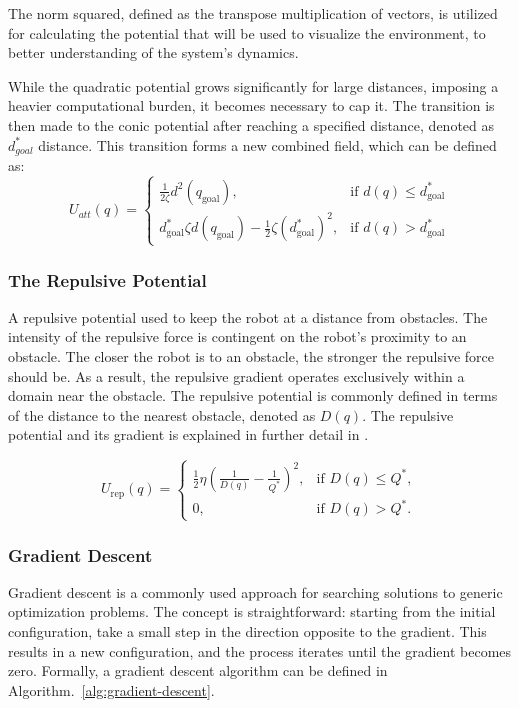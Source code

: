 \documentclass{IEEEtaes}
\begin{document}
{The norm squared, defined as the transpose multiplication of vectors, is utilized for calculating the potential that will be used to visualize the environment, to better understanding of the system's dynamics.

While the quadratic potential grows significantly for large distances, imposing a heavier computational burden, it becomes necessary to cap it. The transition is then made to the conic potential after reaching a specified distance, denoted as $d^*_{goal}$ distance. This transition forms a new combined field, which can be defined as:
\begin{equation*}
U_{att}(q)=
\begin{cases}
        \frac{1}{2\zeta} d^2(q_{\text{goal}}),  &\text{if } d(q) \leq d^*_{\text{goal}} \\
        d^*_{\text{goal}} \zeta d(q_{\text{goal}}) - \frac{1}{2}\zeta \left(d^*_{\text{goal}}\right)^2,  &\text{if } d(q) > d^*_{\text{goal}}
\end{cases}
\end{equation*}


\subsubsection{The Repulsive Potential}

A repulsive potential used to keep the robot at a distance from obstacles. The intensity of the repulsive force is contingent on the robot's proximity to an obstacle. The closer the robot is to an obstacle, the stronger the repulsive force should be. As a result, the repulsive gradient operates exclusively within a domain near the obstacle. The repulsive potential is commonly defined in terms of the distance to the nearest obstacle, denoted as $D(q)$. The repulsive potential and its gradient is explained in further detail in \cite{choset}.

\begin{equation*}
    U_{\text{rep}}(q) =
    \begin{cases}
        \frac{1}{2}\eta (\frac{1}{D(q)} - \frac{1}{Q^*})^2, & \text{if } D(q) \leq Q^*, \\
        0, & \text{if } D(q) > Q^*.
    \end{cases}
\end{equation*}


\subsubsection{Gradient Descent}
Gradient descent is a commonly used approach for searching solutions to generic optimization problems. The concept is straightforward: starting from the initial configuration, take a small step in the direction opposite to the gradient. This results in a new configuration, and the process iterates until the gradient becomes zero. Formally, a gradient descent algorithm can be defined in Algorithm.~\ref{alg:gradient-descent}.


}
\end{document}
